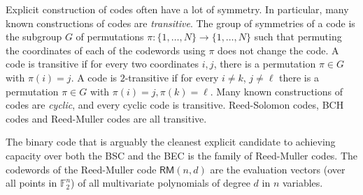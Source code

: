 \documentclass[12pt]{article}
\newcommand{\F}{\mathbb{F}}
\begin{document}
Explicit construction of codes often have a lot of symmetry. In particular, many known constructions of codes are \emph{transitive}. The group of symmetries of a code is the subgroup $G$ of permutations $\pi:\{1,\dotsc, N\} \rightarrow \{1,\dotsc, N\}$ such that permuting the coordinates of each of the codewords using $\pi$ does not change the code. A code is transitive if for every two coordinates $i,j$, there is a permutation $\pi \in G$ with $\pi(i) = j$. A code is $2$-transitive if for every $i \neq k$, $j \neq \ell$ there is a permutation $\pi \in G$ with $\pi(i) = j, \pi(k) = \ell$. Many known constructions of codes are \emph{cyclic}, and every cyclic code is transitive. Reed-Solomon codes, BCH codes and Reed-Muller codes are all transitive. 

The binary code that is arguably the cleanest explicit candidate to achieving capacity over both the BSC and the BEC is the family of Reed-Muller codes. The codewords of the Reed-Muller code $\mathsf{RM}(n,d)$ are the evaluation vectors (over all points in $\F_2^n$) of all multivariate polynomials of degree $d$ in $n$ variables.
\end{document}
